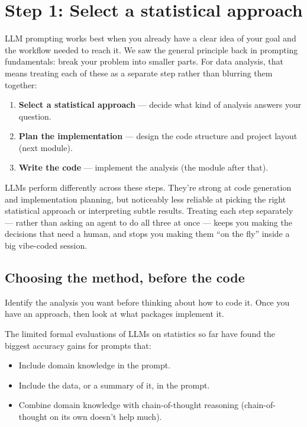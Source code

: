 \documentclass[
  letterpaper,
  DIV=11,
  numbers=noendperiod]{scrreprt}
\providecommand{\tightlist}{%
  \setlength{\itemsep}{0pt}\setlength{\parskip}{0pt}}
\begin{document}
\chapter{Step 1: Select a statistical
approach}\label{step-1-select-a-statistical-approach}

LLM prompting works best when you already have a clear idea of your goal
and the workflow needed to reach it. We saw the general principle back
in prompting fundamentals: break your problem into smaller parts. For
data analysis, that means treating each of these as a separate step
rather than blurring them together:

\begin{enumerate}
\def\labelenumi{\arabic{enumi}.}
\tightlist
\item
  \textbf{Select a statistical approach} --- decide what kind of
  analysis answers your question.
\item
  \textbf{Plan the implementation} --- design the code structure and
  project layout (next module).
\item
  \textbf{Write the code} --- implement the analysis (the module after
  that).
\end{enumerate}

LLMs perform differently across these steps. They're strong at code
generation and implementation planning, but noticeably less reliable at
picking the right statistical approach or interpreting subtle results.
Treating each step separately --- rather than asking an agent to do all
three at once --- keeps you making the decisions that need a human, and
stops you making them ``on the fly'' inside a big vibe-coded session.

\section{Choosing the method, before the
code}\label{choosing-the-method-before-the-code}

Identify the analysis you want before thinking about how to code it.
Once you have an approach, then look at what packages implement it.

The limited formal evaluations of LLMs on statistics so far have found
the biggest accuracy gains for prompts that:

\begin{itemize}
\tightlist
\item
  Include domain knowledge in the prompt.
\item
  Include the data, or a summary of it, in the prompt.
\item
  Combine domain knowledge with chain-of-thought reasoning
  (chain-of-thought on its own doesn't help much).
\end{itemize}
\end{document}
